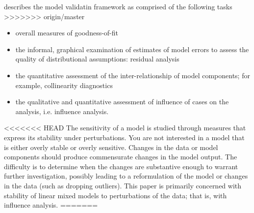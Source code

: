 \documentclass[12pt, a4paper]{report}
\theoremstyle{plain}
\theoremstyle{definition}
\theoremstyle{remark}
\begin{document}
\citet{schab} describes the model validatin framework as comprised of the following tasks
>>>>>>> origin/master
\begin{itemize}
	 \item  overall measures of goodness-of-fit
	\item the informal, graphical examination of estimates of model errors to assess the quality of distributional
	assumptions: residual analysis
	
	
	\item the quantitative assessment of the inter-relationship of model components; for example, collinearity 	diagnostics
	\item the qualitative and quantitative assessment of influence of cases on the analysis, i.e. influence analysis.
\end{itemize}
<<<<<<< HEAD
The sensitivity of a model is studied through measures that express its stability under perturbations. You
are not interested in a model that is either overly stable or overly sensitive. Changes in the data or model
components should produce commensurate changes in the model output. The difficulty is to determine
when the changes are substantive enough to warrant further investigation, possibly leading to a reformulation
of the model or changes in the data (such as dropping outliers). This paper is primarily concerned
with stability of linear mixed models to perturbations of the data; that is, with influence analysis. 
=======

\end{document}
